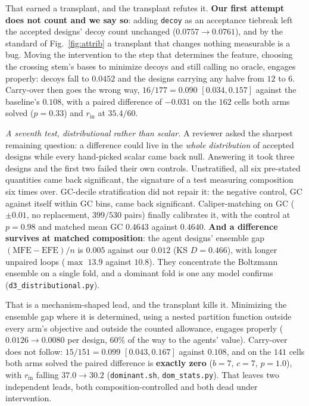 \documentclass[11pt]{article}
\begin{document}
That earned a transplant, and the transplant refutes it. \textbf{Our first attempt does not count and we say
so}: adding \texttt{decoy} as an acceptance tiebreak left the accepted designs' decoy count unchanged
($0.0757\!\to\!0.0761$), and by the standard of Fig.~\ref{fig:attrib} a transplant that changes nothing
measurable is a bug. Moving the intervention to the step that determines the feature, choosing the crossing
stem's bases to minimize decoys and still calling no oracle, engages properly: decoys fall to $0.0452$ and the
designs carrying any halve from $12$ to $6$. Carry-over then goes the wrong way, $16/177=0.090$
$[0.034,0.157]$ against the baseline's $0.108$, with a paired difference of ${-}0.031$ on the $162$ cells both
arms solved ($p{=}0.33$) and $r_{\mathrm{in}}$ at $35.4/60$.

\emph{A seventh test, distributional rather than scalar.} A reviewer asked the sharpest remaining question: a
difference could live in the \emph{whole distribution} of accepted designs while every hand-picked scalar came
back null. Answering it took three designs and the first two failed their own controls. Unstratified, all six
pre-stated quantities came back significant, the signature of a test measuring composition six times over.
GC-decile stratification did not repair it: the negative control, GC against itself within GC bins, came back
significant. Caliper-matching on GC ($\pm0.01$, no replacement, $399/530$ pairs) finally calibrates it, with the
control at $p{=}0.98$ and matched mean GC $0.4643$ against $0.4640$. \textbf{And a difference survives at
matched composition}: the agent designs' ensemble gap $(\mathrm{MFE}-\mathrm{EFE})/n$ is $0.005$ against our
$0.012$ (KS $D{=}0.466$), with longer unpaired loops ($\max$ $13.9$ against $10.8$). They concentrate the
Boltzmann ensemble on a single fold, and a dominant fold is one any model confirms
(\texttt{d3\_distributional.py}).

That is a mechanism-shaped lead, and the transplant kills it. Minimizing the ensemble gap where it is
determined, using a nested partition function outside every arm's objective and outside the counted allowance,
engages properly ($0.0126\to0.0080$ per design, $60\%$ of the way to the agents' value). Carry-over does not
follow: $15/151=0.099$ $[0.043,0.167]$ against $0.108$, and on the $141$ cells both arms solved the paired
difference is \textbf{exactly zero} ($b{=}7$, $c{=}7$, $p{=}1.0$), with $r_{\mathrm{in}}$ falling $37.0\to30.2$
(\texttt{dominant.sh}, \texttt{dom\_stats.py}). That leaves two independent leads, both composition-controlled and both dead
under intervention.
\end{document}
